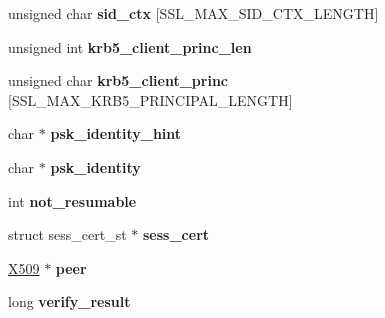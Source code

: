 \begin{DoxyCompactItemize}
\item 
\hypertarget{structssl__session__st_ad465f7554a5e14d6c92ee563d5ed6fe1}{}unsigned char {\bfseries sid\+\_\+ctx} \mbox{[}S\+S\+L\+\_\+\+M\+A\+X\+\_\+\+S\+I\+D\+\_\+\+C\+T\+X\+\_\+\+L\+E\+N\+G\+T\+H\mbox{]}\label{structssl__session__st_ad465f7554a5e14d6c92ee563d5ed6fe1}

\item 
\hypertarget{structssl__session__st_ab87e9ec7a53c471d4f98d0479f48fc01}{}unsigned int {\bfseries krb5\+\_\+client\+\_\+princ\+\_\+len}\label{structssl__session__st_ab87e9ec7a53c471d4f98d0479f48fc01}

\item 
\hypertarget{structssl__session__st_a0b4981b6ae2db5a19c054026c354c062}{}unsigned char {\bfseries krb5\+\_\+client\+\_\+princ} \mbox{[}S\+S\+L\+\_\+\+M\+A\+X\+\_\+\+K\+R\+B5\+\_\+\+P\+R\+I\+N\+C\+I\+P\+A\+L\+\_\+\+L\+E\+N\+G\+T\+H\mbox{]}\label{structssl__session__st_a0b4981b6ae2db5a19c054026c354c062}

\item 
\hypertarget{structssl__session__st_a41b456bc4b62a3c246372c264b380f92}{}char $\ast$ {\bfseries psk\+\_\+identity\+\_\+hint}\label{structssl__session__st_a41b456bc4b62a3c246372c264b380f92}

\item 
\hypertarget{structssl__session__st_a3dce1596980f30431f28a87db7a4161e}{}char $\ast$ {\bfseries psk\+\_\+identity}\label{structssl__session__st_a3dce1596980f30431f28a87db7a4161e}

\item 
\hypertarget{structssl__session__st_a1b4d198b4cf95c73b1e73b06cf521bac}{}int {\bfseries not\+\_\+resumable}\label{structssl__session__st_a1b4d198b4cf95c73b1e73b06cf521bac}

\item 
\hypertarget{structssl__session__st_abd0e4711818e1c3373870f0e09d718be}{}struct sess\+\_\+cert\+\_\+st $\ast$ {\bfseries sess\+\_\+cert}\label{structssl__session__st_abd0e4711818e1c3373870f0e09d718be}

\item 
\hypertarget{structssl__session__st_a925bea83587ffedbbdb4aa386b75a2d7}{}\hyperlink{structx509__st}{X509} $\ast$ {\bfseries peer}\label{structssl__session__st_a925bea83587ffedbbdb4aa386b75a2d7}

\item 
\hypertarget{structssl__session__st_a448769f219815a3a49b726d5ab288783}{}long {\bfseries verify\+\_\+result}\label{structssl__session__st_a448769f219815a3a49b726d5ab288783}


\end{DoxyCompactItemize}
